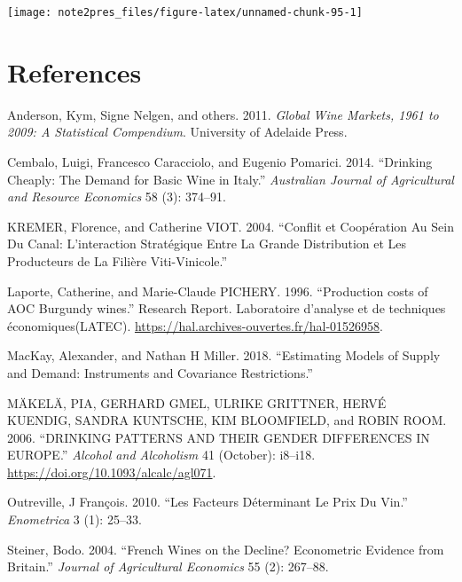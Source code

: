 \documentclass[11pt,]{article}
\begin{document}
\FloatBarrier

\begin{center}\texttt{[image: note2pres\_files/figure-latex/unnamed-chunk-95-1]} \end{center}

\FloatBarrier

\newpage

\hypertarget{references}{%
\section*{References}\label{references}}

\hypertarget{refs}{}
\leavevmode\hypertarget{ref-anderson2011global}{}%
Anderson, Kym, Signe Nelgen, and others. 2011. \emph{Global Wine
Markets, 1961 to 2009: A Statistical Compendium}. University of Adelaide
Press.

\leavevmode\hypertarget{ref-cembalo2014}{}%
Cembalo, Luigi, Francesco Caracciolo, and Eugenio Pomarici. 2014.
``Drinking Cheaply: The Demand for Basic Wine in Italy.''
\emph{Australian Journal of Agricultural and Resource Economics} 58 (3):
374--91.

\leavevmode\hypertarget{ref-kremer2004}{}%
KREMER, Florence, and Catherine VIOT. 2004. ``Conflit et Coopération Au
Sein Du Canal: L'interaction Stratégique Entre La Grande Distribution et
Les Producteurs de La Filière Viti-Vinicole.''

\leavevmode\hypertarget{ref-laporte1996}{}%
Laporte, Catherine, and Marie-Claude PICHERY. 1996. ``Production costs
of AOC Burgundy wines.'' Research Report. Laboratoire d'analyse et de
techniques économiques(LATEC).
\url{https://hal.archives-ouvertes.fr/hal-01526958}.

\leavevmode\hypertarget{ref-mackay2018}{}%
MacKay, Alexander, and Nathan H Miller. 2018. ``Estimating Models of
Supply and Demand: Instruments and Covariance Restrictions.''

\leavevmode\hypertarget{ref-makela2006}{}%
MÄKELÄ, PIA, GERHARD GMEL, ULRIKE GRITTNER, HERVÉ KUENDIG, SANDRA
KUNTSCHE, KIM BLOOMFIELD, and ROBIN ROOM. 2006. ``DRINKING PATTERNS AND
THEIR GENDER DIFFERENCES IN EUROPE.'' \emph{Alcohol and Alcoholism} 41
(October): i8--i18. \url{https://doi.org/10.1093/alcalc/agl071}.

\leavevmode\hypertarget{ref-outreville2010}{}%
Outreville, J François. 2010. ``Les Facteurs Déterminant Le Prix Du
Vin.'' \emph{Enometrica} 3 (1): 25--33.

\leavevmode\hypertarget{ref-steiner2004}{}%
Steiner, Bodo. 2004. ``French Wines on the Decline? Econometric Evidence
from Britain.'' \emph{Journal of Agricultural Economics} 55 (2):
267--88.
\end{document}
